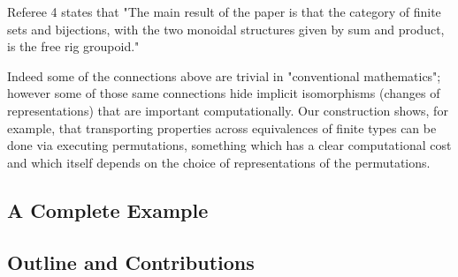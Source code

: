
 Referee 4 states that "The main result of the paper is that the
  category of finite sets and bijections, with the two monoidal
  structures given by sum and product, is the free rig groupoid."

  Indeed some of the connections above are trivial in "conventional
mathematics"; however some of those same connections hide implicit
isomorphisms (changes of representations) that are important
computationally.  Our construction shows, for example, that
transporting properties across equivalences of finite types can be
done via executing permutations, something which has a clear
computational cost and which itself depends on the choice of
representations of the permutations.

\subsection*{A Complete Example}




\subsection*{Outline and Contributions}


